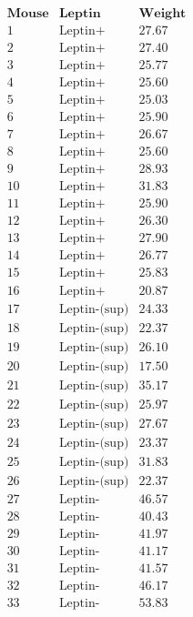 \documentclass[
]{book}
\begin{document}
\[
  \begin{array}{ccc}
  \mathbf{Mouse} & \mathbf{Leptin} & \mathbf{Weight} \\ 
  1 & \text{Leptin+} & 27.67 \\
  2 & \text{Leptin+} & 27.40 \\
  3 & \text{Leptin+} & 25.77 \\
  4 & \text{Leptin+} & 25.60 \\
  5 & \text{Leptin+} & 25.03 \\
  6 & \text{Leptin+} & 25.90 \\
  7 & \text{Leptin+} & 26.67 \\
  8 & \text{Leptin+} & 25.60 \\
  9 & \text{Leptin+} & 28.93 \\
  10 & \text{Leptin+} & 31.83 \\
  11 & \text{Leptin+} & 25.90 \\
  12 & \text{Leptin+} & 26.30 \\
  13 & \text{Leptin+} & 27.90 \\
  14 & \text{Leptin+} & 26.77 \\
  15 & \text{Leptin+} & 25.83 \\
  16 & \text{Leptin+} & 20.87 \\
  17 & \text{Leptin-(sup)} & 24.33 \\
  18 & \text{Leptin-(sup)} & 22.37 \\
  19 & \text{Leptin-(sup)} & 26.10 \\
  20 & \text{Leptin-(sup)} & 17.50 \\
  21 & \text{Leptin-(sup)} & 35.17 \\
  22 & \text{Leptin-(sup)} & 25.97 \\
  23 & \text{Leptin-(sup)} & 27.67 \\
  24 & \text{Leptin-(sup)} & 23.37 \\
  25 & \text{Leptin-(sup)} & 31.83 \\
  26 & \text{Leptin-(sup)} & 22.37 \\
  27 & \text{Leptin-} & 46.57 \\
  28 & \text{Leptin-} & 40.43 \\
  29 & \text{Leptin-} & 41.97 \\
  30 & \text{Leptin-} & 41.17 \\
  31 & \text{Leptin-} & 41.57 \\
  32 & \text{Leptin-} & 46.17 \\
  33 & \text{Leptin-} & 53.83 \\
  \end{array}
\]
\end{document}
